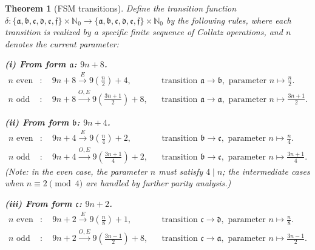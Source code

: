 \documentclass[10pt,a4paper]{amsart}
\newtheorem{theorem}{Theorem}
\newcommand{\N}{\mathbb{N}}
\begin{document}
\begin{theorem}[FSM transitions]\label{thm:fsm_transitions}
  Define the transition function $\delta: \{\mathfrak{a}, \mathfrak{b}, \mathfrak{c}, \mathfrak{d}, \mathfrak{e}, \mathfrak{f}\} \times \N_0 \to \{\mathfrak{a}, \mathfrak{b}, \mathfrak{c}, \mathfrak{d}, \mathfrak{e}, \mathfrak{f}\} \times \N_0$ by the following rules, where each transition is realized by a specific finite sequence of Collatz operations, and $n$ denotes the current parameter:

  \medskip
  \noindent\textbf{(i) From form $\mathfrak{a}$: $9n+8$.}
  \begin{align}
    n \text{ even} &: \quad 9n+8 \xrightarrow{E} 9\!\left(\tfrac{n}{2}\right)+4, && \text{transition } \mathfrak{a} \to \mathfrak{b}, \text{ parameter } n \mapsto \tfrac{n}{2}. \label{eq:a_even} \\
    n \text{ odd} &: \quad 9n+8 \xrightarrow{O,E} 9\!\left(\tfrac{3n+1}{2}\right)+8, && \text{transition } \mathfrak{a} \to \mathfrak{a}, \text{ parameter } n \mapsto \tfrac{3n+1}{2}. \label{eq:a_odd}
  \end{align}

  \medskip
  \noindent\textbf{(ii) From form $\mathfrak{b}$: $9n+4$.}
  \begin{align}
    n \text{ even} &: \quad 9n+4 \xrightarrow{E} 9\!\left(\tfrac{n}{4}\right)+2, && \text{transition } \mathfrak{b} \to \mathfrak{c}, \text{ parameter } n \mapsto \tfrac{n}{4}. \label{eq:b_even} \\
    n \text{ odd} &: \quad 9n+4 \xrightarrow{O,E} 9\!\left(\tfrac{3n+1}{4}\right)+2, && \text{transition } \mathfrak{b} \to \mathfrak{c}, \text{ parameter } n \mapsto \tfrac{3n+1}{4}. \label{eq:b_odd}
  \end{align}
  (Note: in the even case, the parameter $n$ must satisfy $4 \mid n$; the intermediate cases when $n \equiv 2 \pmod{4}$ are handled by further parity analysis.)

  \medskip
  \noindent\textbf{(iii) From form $\mathfrak{c}$: $9n+2$.}
  \begin{align}
    n \text{ even} &: \quad 9n+2 \xrightarrow{E} 9\!\left(\tfrac{n}{8}\right)+1, && \text{transition } \mathfrak{c} \to \mathfrak{d}, \text{ parameter } n \mapsto \tfrac{n}{8}. \label{eq:c_even} \\
    n \text{ odd} &: \quad 9n+2 \xrightarrow{O,E} 9\!\left(\tfrac{3n-1}{2}\right)+8, && \text{transition } \mathfrak{c} \to \mathfrak{a}, \text{ parameter } n \mapsto \tfrac{3n-1}{2}. \label{eq:c_odd}
  \end{align}


\end{theorem}
\end{document}
